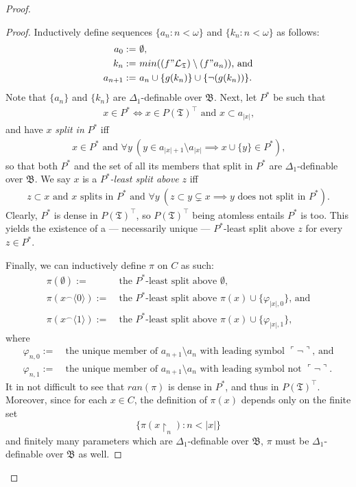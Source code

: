 \documentclass[12pt]{article}
\numberwithin{equation}{section}
\begin{document}
\begin{proof}
\begin{proof}
Inductively define sequences $\{a_n : n < \omega\}$ and $\{k_n : n < \omega\}$ as follows:
\begin{align*}
    a_0 := \ & \emptyset \text{,} \\
    k_n := \ & min((f" \mathcal{L}_{\mathfrak{T}}) \setminus (f" a_n)) \text{, and} \\
    a_{n + 1} := \ & a_n \cup \{g(k_n)\} \cup \{\neg(g(k_n))\} \text{.}
\end{align*}
Note that $\{a_n\}$ and $\{k_n\}$ are $\Delta_1$-definable over $\mathfrak{B}$. Next, let $P^*$ be such that
\begin{align*}
    x \in P^* \iff x \in P(\mathfrak{T})^{\top} \text{ and } x \subset a_{|x|} \text{,}
\end{align*}
and have $x$ \emph{split in} $P^*$ iff
\begin{align*}
    x \in P^* \text{ and } \forall y \ (y \in a_{|x| + 1} \setminus a_{|x|} \implies x \cup \{y\} \in P^*) \text{,}
\end{align*}
so that both $P^*$ and the set of all its members that split in $P^*$ are $\Delta_1$-definable over $\mathfrak{B}$. We say $x$ is a $P^*$\emph{-least split above} $z$ iff
\begin{align*}
    z \subset x \text{ and } x \text{ splits in } P^* \text{ and } \forall y \ (z \subset y \subsetneq x \implies y \text{ does not split in } P^*) \text{.}
\end{align*}
Clearly, $P^*$ is dense in $P(\mathfrak{T})^{\top}$, so $P(\mathfrak{T})^{\top}$ being atomless entails $P^*$ is too. This yields the existence of a --- necessarily unique --- $P^*$-least split above $z$ for every $z \in P^*$.

Finally, we can inductively define $\pi$ on $C$ as such:
\begin{align*}
    \pi(\emptyset) := \ & \text{the } P^* \text{-least split above } \emptyset \text{,} \\
    \pi(x^{\frown}\langle 0 \rangle) := \ & \text{the } P^* \text{-least split above } \pi(x) \cup \{\varphi_{|x|, 0}\} \text{, and} \\
    \pi(x^{\frown}\langle 1 \rangle) := \ & \text{the } P^* \text{-least split above } \pi(x) \cup \{\varphi_{|x|, 1}\} \text{,}
\end{align*}
where
\begin{align*}
    \varphi_{n, 0} := \ & \text{the unique member of } a_{n + 1} \setminus a_n \text{ with leading symbol } \ulcorner \neg \urcorner \text{, and} \\
    \varphi_{n, 1} := \ & \text{the unique member of } a_{n + 1} \setminus a_n \text{ with leading symbol not } \ulcorner \neg \urcorner \text{.} 
\end{align*}
It in not difficult to see that $ran(\pi)$ is dense in $P^*$, and thus in $P(\mathfrak{T})^{\top}$. Moreover, since for each $x \in C$, the definition of $\pi(x)$ depends only on the finite set $$\{\pi(x \! \restriction_n) : n < |x|\}$$ and finitely many parameters which are $\Delta_1$-definable over $\mathfrak{B}$, $\pi$ must be $\Delta_1$-definable over $\mathfrak{B}$ as well.
\end{proof}


\end{proof}
\end{document}
